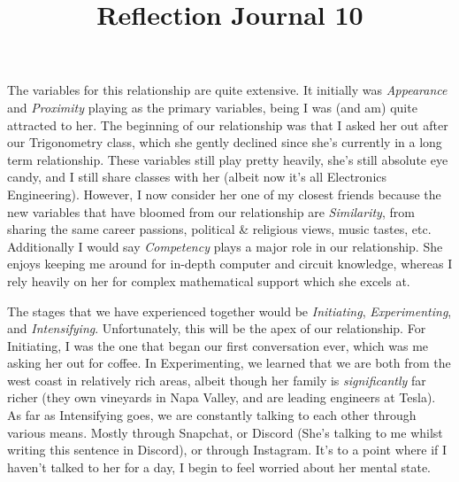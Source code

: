 \documentclass[12pt]{article}
\begin{document}
\title{Reflection Journal 10}
%
\par
The variables for this relationship are quite extensive. It initially was \emph{Appearance} and \emph{Proximity} playing as the primary variables, being I was (and am) quite attracted to her. The beginning of our relationship was that I asked her out after our Trigonometry class, which she gently declined since she's currently in a long term relationship. These variables still play pretty heavily, she's still absolute eye candy, and I still share classes with her (albeit now it's all Electronics Engineering). However, I now consider her one of my closest friends because the new variables that have bloomed from our relationship are \emph{Similarity}, from sharing the same career passions, political & religious views, music tastes, etc. Additionally I would say \emph{Competency} plays a major role in our relationship. She enjoys keeping me around for in-depth computer and circuit knowledge, whereas I rely heavily on her for complex mathematical support which she excels at.
\par
The stages that we have experienced together would be \emph{Initiating}, \emph{Experimenting}, and \emph{Intensifying}. Unfortunately, this will be the apex of our relationship. For Initiating, I was the one that began our first conversation ever, which was me asking her out for coffee. In Experimenting, we learned that we are both from the west coast in relatively rich areas, albeit though her family is \emph{significantly} far richer (they own vineyards in Napa Valley, and are leading engineers at Tesla). As far as Intensifying goes, we are constantly talking to each other through various means. Mostly through Snapchat, or Discord (She's talking to me whilst writing this sentence in Discord), or through Instagram. It's to a point where if I haven't talked to her for a day, I begin to feel worried about her mental state.
%
\end{document}
